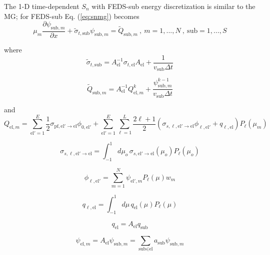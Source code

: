 \documentclass{article}
\begin{document}
The 1-D time-dependent $S_n$ with FEDS-sub energy discretization is similar to the MG; for FEDS-sub Eq. (\ref{eq:snmg}) becomes
\begin{equation}
\mu_m \frac{\partial \psi_{\text{sub},m}}{\partial x} + \tilde{\sigma}_{t,\text{sub}} \psi_{\text{sub},m}  = \tilde{Q}_{\text{sub},m} \:,  \: m=1,...,N \:, \: \text{sub}=1,...,S 
\end{equation}

where  
\begin{equation*}
\tilde{\sigma}_{t,\text{sub}} = A^{-1}_\text{el} \sigma_{t,\text{el}} A_\text{el} + \frac{1}{v_\text{sub} \Delta t} 
\end{equation*} 

\begin{equation*}
\tilde{Q}_{\text{sub},m} = A_\text{el}^{-1} Q^{k}_{\text{el},m} + \frac{\psi^{k-1}_{\text{sub},m}}{v_{\text{sub}} \Delta t}
\end{equation*} 

and
\begin{equation*}
Q_{\text{el},m} = \sum_{\text{el}'=1}^E \frac{1}{2} \sigma_{\text{pf},\text{el}' \to \text{el}} \phi_{0,\text{el}'} + \sum_{\text{el}'=1}^E \sum_{\ell=1}^L \frac{2 \ell + 1}{2} (\sigma_{s,\ell,\text{el}'\to \text{el}}\phi_{\ell,\text{el}'} + q_{\ell,\text{el}}) P_\ell(\mu_m)
\end{equation*}

\begin{equation*}
\sigma_{s,\ell,\text{el}'\to \text{el}} = \int_{-1}^1 d\mu_o \, \sigma_{s,\text{el}' \to \text{el}} (\mu_o) P_\ell(\mu_o) 
\end{equation*}

\begin{equation*}
\phi_{\ell,\text{el}'} = \sum_{m=1}^N \psi_{\text{el}',m} P_\ell(\mu) w_m 
\end{equation*}

\begin{equation*}
q_{\ell,\text{el}} = \int_{-1}^1 d\mu \, q_{\text{el}} (\mu) P_\ell(\mu)
\end{equation*}

\begin{equation*}
q_{\text{el}} = A_\text{el} q_\text{sub}
\end{equation*}

\begin{equation*}
\psi_{\text{el},m} = A_\text{el} \psi_{\text{sub},m} = \sum_{\text{sub} \in \text{el}} a_\text{sub} \psi_{\text{sub},m}
\end{equation*}
\end{document}
